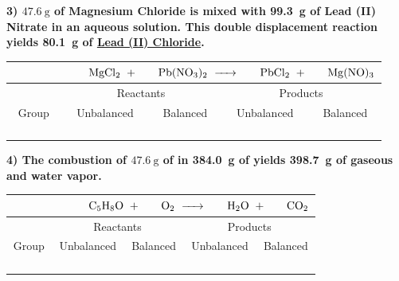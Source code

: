 \documentclass[12pt, oneside, letterpaper]{book}
\begin{document}
\textbf{3) $\qty{47.6}{\gram}$ of Magnesium Chloride is mixed with \qty{99.3}{\gram} of Lead (II) Nitrate in an aqueous solution. This double displacement reaction yields \qty{80.1}{\gram} of \underline{Lead (II) Chloride}.}
\begin{table}[H]
\centering
\begin{tabular}{|c||c|c||c|c|} 
 \multicolumn{5}{c}{$\phantom{Group 12345678}
    \ce{MgCl2} \ + \ 
    \phantom{123} \ce{Pb(NO3)2} \ \ce{->} \ 
    \phantom{123} \ce{PbCl2} \ + \ 
    \phantom{123} \ce{Mg(NO)3}$} \\
 \hline
    & \multicolumn{2}{c||}{Reactants} & \multicolumn{2}{c|}{Products} \\
 \hline
 Group & Unbalanced & Balanced & Unbalanced & Balanced\\ 
 \hline\hline
   & & & & \\
 \hline
   & & & & \\
 \hline
  & & & & \\
 \hline
  & & & & \\[1ex] 
 \hline
\end{tabular}
\end{table}

\textbf{4) The combustion of $\qty{47.6}{\gram}$ of  in \qty{384.0}{\gram} of  yields \qty{398.7}{\gram} of gaseous \underline{} and water vapor.}
\begin{table}[H]
\centering
\begin{tabular}{|c||c|c||c|c|} 
 \multicolumn{5}{c}{$\phantom{Group 12345678}
    \ce{C5H8O} \ + \ 
    \phantom{123} \ce{O2} \ \ce{->} \ 
    \phantom{123} \ce{H2O} \ + \ 
    \phantom{123} \ce{CO2}$} \\
 \hline
    & \multicolumn{2}{c||}{Reactants} & \multicolumn{2}{c|}{Products} \\
 \hline
 Group & Unbalanced & Balanced & Unbalanced & Balanced\\ 
 \hline\hline
   & & & & \\
 \hline
   & & & & \\
 \hline
  & & & & \\
 \hline
  & & & & \\[1ex] 
 \hline
\end{tabular}
\end{table}
\end{document}
